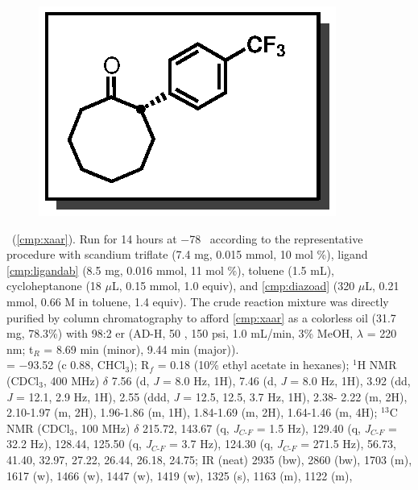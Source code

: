 \pagebreak
\begin{figure}
  \vspace{-12pt}
  \begin{center}
    \includegraphics[scale=0.8]{chp_asymmetric/images/xaar}
  \end{center}
  \vspace{-25pt}
\end{figure}\noindent \textbf{\CMPxaar}\ (\ref{cmp:xaar}). Run for 14 hours
at $-$78 \degc\  according to the representative procedure with scandium
triflate (7.4 mg, 0.015 mmol, 10 mol \%), ligand \ref{cmp:ligandab} (8.5 mg,
0.016 mmol, 11 mol \%), toluene (1.5 mL), cycloheptanone (18 $\mu$L, 0.15 mmol,
1.0 equiv), and \ref{cmp:diazoad} (320 $\mu$L, 0.21 mmol, 0.66 M in toluene, 1.4
equiv).
The crude reaction mixture was directly purified by column chromatography to
afford \ref{cmp:xaar} as a colorless oil (31.7 mg, 78.3\%) with 98:2 er (AD-H,
50 \degc, 150 psi, 1.0 mL/min, 3\% MeOH, $\lambda$ = 220 nm; t$_R$ = 8.69 min
(minor), 9.44 min (major)). \\
\rotation = $-$93.52 (c 0.88, CHCl$_3$); R$_f$ = 0.18 (10\% ethyl acetate in
hexanes); $^1$H NMR (CDCl$_3$, 400 MHz) $\delta$ 7.56 (d, \textit{J} = 8.0 Hz, 1H), 7.46
(d, \textit{J} = 8.0 Hz, 1H), 3.92 (dd, \textit{J} = 12.1, 2.9 Hz, 1H), 2.55
(ddd, \textit{J} = 12.5, 12.5, 3.7 Hz, 1H), 2.38- 2.22 (m, 2H), 2.10-1.97 (m,
2H), 1.96-1.86 (m, 1H), 1.84-1.69 (m, 2H), 1.64-1.46 (m, 4H); $^{13}$C NMR
(CDCl$_3$, 100 MHz) $\delta$ 215.72, 143.67 (q, \textit{J}$_{C\mbox{-}F}$ = 1.5 Hz), 129.40 (q, \textit{J}$_{C\mbox{-}F}$
= 32.2 Hz), 128.44, 125.50 (q, \textit{J}$_{C\mbox{-}F}$ = 3.7 Hz), 124.30 (q, \textit{J}$_{C\mbox{-}F}$ = 271.5 Hz),
56.73, 41.40, 32.97, 27.22, 26.44, 26.18, 24.75; IR (neat) 2935 (bw), 2860 (bw),
1703 (m), 1617 (w), 1466 (w), 1447 (w), 1419 (w), 1325 (s), 1163 (m), 1122 (m),

